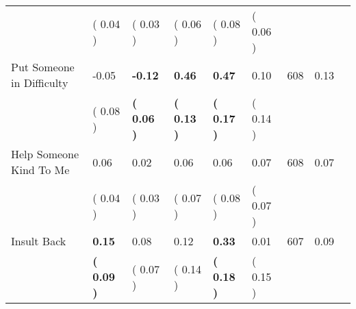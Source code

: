 \begin{tabular}{L{6.2cm} C{1.8cm} C{1.8cm} C{1.8cm} C{1.8cm} C{1.8cm} C{1.8cm} C{0.3cm} C{0.3cm}}
 & (     0.04 ) & (     0.03 ) & (     0.06 ) & (     0.08 ) & (     0.06 )  & \\
Put Someone in Difficulty &     -0.05 & \textbf{    -0.12} & \textbf{     0.46} & \textbf{     0.47} &      0.10  & 608 &       0.13 \\ 
 & (     0.08 ) & \textbf{(     0.06 )} & \textbf{(     0.13 )} & \textbf{(     0.17 )} & (     0.14 )  & \\
Help Someone Kind To Me &      0.06 &      0.02 &      0.06 &      0.06 &      0.07  & 608 &       0.07 \\ 
 & (     0.04 ) & (     0.03 ) & (     0.07 ) & (     0.08 ) & (     0.07 )  & \\
Insult Back & \textbf{     0.15} &      0.08 &      0.12 & \textbf{     0.33} &      0.01  & 607 &       0.09 \\ 
 & \textbf{(     0.09 )} & (     0.07 ) & (     0.14 ) & \textbf{(     0.18 )} & (     0.15 )  & \\
\bottomrule
\end{tabular}
